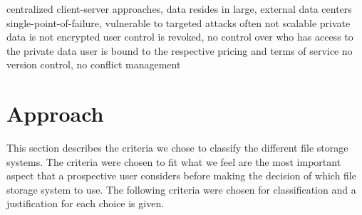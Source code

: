     centralized client-server approaches, data resides in large, external data centers
    single-point-of-failure, vulnerable to targeted attacks
    often not scalable
    private data is not encrypted
    user control is revoked, no control over who has access to the private data
    user is bound to the respective pricing and terms of service
    no version control, no conflict management

\section{Approach} %
This section describes the criteria we chose to classify the different file storage systems. The criteria were chosen to fit what we feel are the most important aspect that a prospective user considers before making the decision of which file storage system to use. The following criteria were chosen for classification and a justification for each choice is given.

